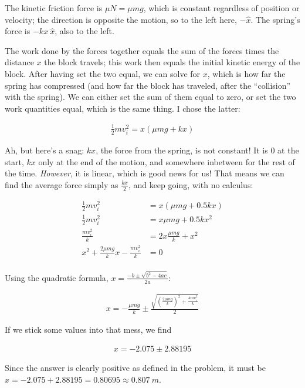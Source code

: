 \documentclass[12pt,a4paper]{report}
\begin{document}
The kinetic friction force is $\mu N = \mu m g$, which is constant regardless of position or velocity; the direction is opposite the motion, so to the left here, $-\hat{x}$. The spring's force is $-k x\ \hat{x}$, also to the left.

The work done by the forces together equals the sum of the forces times the distance $x$ the block travels; this work then equals the initial kinetic energy of the block. After having set the two equal, we can solve for $x$, which is how far the spring has compressed (and how far the block has traveled, after the ``collision'' with the spring). We can either set the sum of them equal to zero, or set the two work quantities equal, which is the same thing. I chose the latter:

\begin{align}
\frac{1}{2} m v_i^2 = x \left(\mu m g + k x\right)
\end{align}

Ah, but here's a snag: $k x$, the force from the spring, is not constant! It is 0 at the start, $k x$ only at the end of the motion, and somewhere inbetween for the rest of the time. \emph{However}, it is linear, which is good news for us! That means we can find the average force simply as $\frac{k x}{2}$, and keep going, with no calculus:

\begin{align}
\frac{1}{2} m v_i^2 &= x \left(\mu m g + 0.5 k x\right)\\
\frac{1}{2} m v_i^2 &= x \mu m g + 0.5 k x^2\\
\frac{m v_i^2}{k} &= 2 x \frac{\mu m g}{k} + x^2\\
x^2 + \frac{2\mu m g}{k} x - \frac{m v_i^2}{k} &= 0\\
\end{align}

Using the quadratic formula, $\displaystyle x = \frac{-b \pm \sqrt{b^2 - 4 a c}}{2a}$:

\begin{align}
x = -\frac{\mu m g}{k} \pm \frac{\sqrt{\left(\frac{2 \mu m g}{k}\right)^2 + \frac{4 m v_i^2}{k}}}{2}
\end{align}

If we stick some values into that mess, we find

\begin{align}
x = -2.075 \pm 2.88195
\end{align}

Since the answer is clearly positive as defined in the problem, it must be $x = -2.075 + 2.88195 = 0.80695 \approx \SI{0.807}{m}$.
\end{document}
